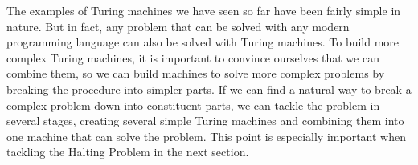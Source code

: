 \documentclass[../../../include/open-logic-section]{subfiles}
\begin{document}

\begin{explain}
The examples of Turing machines we have seen so far have been fairly
simple in nature. But in fact, any problem that can be solved with any
modern programming language can also be solved with Turing machines.
To build more complex Turing machines, it is important to convince
ourselves that we can combine them, so we can build machines to solve
more complex problems by breaking the procedure into simpler parts.
If we can find a natural way to break a complex problem down into
constituent parts, we can tackle the problem in several stages,
creating several simple Turing machines and combining them into one
machine that can solve the problem. This point is especially important
when tackling the Halting Problem in the next section.
\end{explain}
\end{document}
